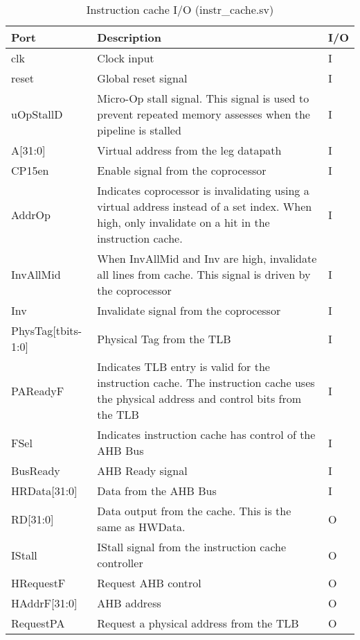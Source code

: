 	\begin{table} \label{table:instrio}
	\begin{tabular}{|l|p{85mm}|l|}
	\hline Port & Description & I/O \\ 
	\hline clk & Clock input &  I \\ 
	\hline reset & Global reset signal &  I \\ 
	\hline uOpStallD & Micro-Op stall signal. This signal is used to prevent repeated memory assesses when the pipeline is stalled &  I \\ 
	\hline A[31:0] & Virtual address from the leg datapath & I \\
	\hline CP15en & Enable signal from the coprocessor & I \\
	\hline AddrOp & Indicates coprocessor is invalidating using a virtual address instead of a set index. When high, only invalidate on a hit in the instruction cache.& I \\
	\hline InvAllMid & When InvAllMid and Inv are high, invalidate all lines from cache. This signal is driven by the coprocessor & I \\
	\hline Inv & Invalidate signal from the coprocessor & I \\
	\hline PhysTag[tbits-1:0] & Physical Tag from the TLB & I \\
	\hline PAReadyF & Indicates TLB entry is valid for the instruction cache. The instruction cache uses the physical address and control bits from the TLB & I \\
	\hline FSel & Indicates instruction cache has control of the AHB Bus & I \\
	\hline BusReady & AHB Ready signal & I \\
	\hline HRData[31:0] & Data from the AHB Bus & I \\
	\hline RD[31:0] & Data output from the cache. This is the same as HWData. & O \\
	\hline IStall & IStall signal from the instruction cache controller & O \\
	\hline HRequestF & Request AHB control & O \\
	\hline HAddrF[31:0] & AHB address & O \\
	\hline RequestPA & Request a physical address from the TLB & O \\
	\hline
	\end{tabular} 
	\caption{Instruction cache I/O (instr\_cache.sv)}
	\end{table}

